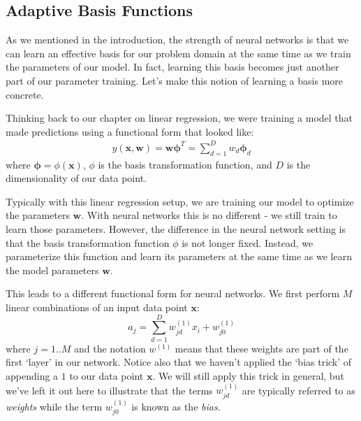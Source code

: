 \subsection{Adaptive Basis Functions}
As we mentioned in the introduction, the strength of neural networks is that we can learn an effective basis for our problem domain at the same time as we train the parameters of our model. In fact, learning this basis becomes just another part of our parameter training. Let's make this notion of learning a basis more concrete.

Thinking back to our chapter on linear regression, we were training a model that made predictions using a functional form that looked like:
\begin{align*}
	y(\textbf{x}, \textbf{w}) = \textbf{w} \boldsymbol{\phi}^{T} = \sum_{d=1}^{D} w_{d} \boldsymbol{\phi}_{d}
\end{align*}
where $\boldsymbol{\phi} = \phi(\textbf{x})$, $\phi$ is the basis transformation function, and $D$ is the dimensionality of our data point.

Typically with this linear regression setup, we are training our model to optimize the parameters $\textbf{w}$. With neural networks this is no different - we still train to learn those parameters. However, the difference in the neural network setting is that the basis transformation function $\phi$ is not longer fixed. Instead, we parameterize this function and learn its parameters at the same time as we learn the model parameters $\textbf{w}$.


This leads to a different functional form for neural networks. We first perform $M$ linear combinations of an input data point $\textbf{x}$:
\begin{equation} \label{basic-nn-form}
	a_{j} = \sum_{d=1}^{D} w_{jd}^{(1)} x_{i} + w_{j0}^{(1)}
\end{equation}
where $j=1..M$ and the notation $w^{(1)}$ means that these weights are part of the first `layer' in our network. Notice also that we haven't applied the `bias trick' of appending a $1$ to our data point $\textbf{x}$. We will still apply this trick in general, but we've left it out here to illustrate that the terms $w_{jd}^{(1)}$ are typically referred to as \textit{weights} while the term $w_{j0}^{(1)}$ is known as the \textit{bias}.

